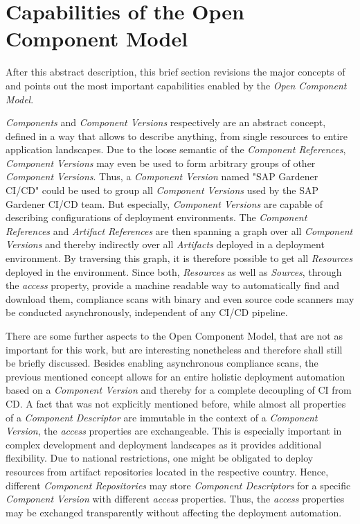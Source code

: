 \section{Capabilities of the Open Component Model}
After this abstract description, this brief section revisions the major concepts of and points out the most important capabilities enabled by the \emph{Open Component Model}.\par 
\emph{Components} and \emph{Component Versions} respectively are an abstract concept, defined in a way that allows to describe anything, from single resources to entire application landscapes. Due to the loose semantic of the \emph{Component References}, \emph{Component Versions} may even be used to form arbitrary groups of other \emph{Component Versions}. Thus, a \emph{Component Version} named "SAP Gardener CI/CD" could be used to group all \emph{Component Versions} used by the SAP Gardener CI/CD team. But especially, \emph{Component Versions} are capable of describing configurations of deployment environments. The \emph{Component References} and \emph{Artifact References} are then spanning a graph over all \emph{Component Versions} and thereby indirectly over all \emph{Artifacts} deployed in a deployment environment. By traversing this graph, it is therefore possible to get all \emph{Resources} deployed in the environment. Since both, \emph{Resources} as well as \emph{Sources}, %
through the \emph{access} property, provide a machine readable way to automatically find and download them, compliance scans with binary and even source code scanners may be conducted asynchronously, independent of any CI/CD pipeline.\par
There are some further aspects to the Open Component Model, that are not as important for this work, but are interesting nonetheless and therefore shall still be briefly discussed. Besides enabling asynchronous compliance scans, the previous mentioned concept allows for an entire holistic deployment automation based on a \emph{Component Version} and thereby for a complete decoupling of CI from CD. A fact that was not explicitly mentioned before, while almost all properties of a \emph{Component Descriptor} are immutable in the context of a \emph{Component Version}, the \emph{access} properties are exchangeable. This is especially important in complex development and deployment landscapes as it provides additional flexibility. Due to national restrictions, one might be obligated to deploy resources from artifact repositories located in the respective country. Hence, different \emph{Component Repositories} may store \emph{Component Descriptors} for a specific \emph{Component Version} with different \emph{access} properties. Thus, the \emph{access} properties may be exchanged transparently without affecting the deployment automation.\par
